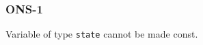 \subsubsection{ONS-1}\label{sec:error_code_ons_1}

Variable of type \texttt{state} cannot be made const.


